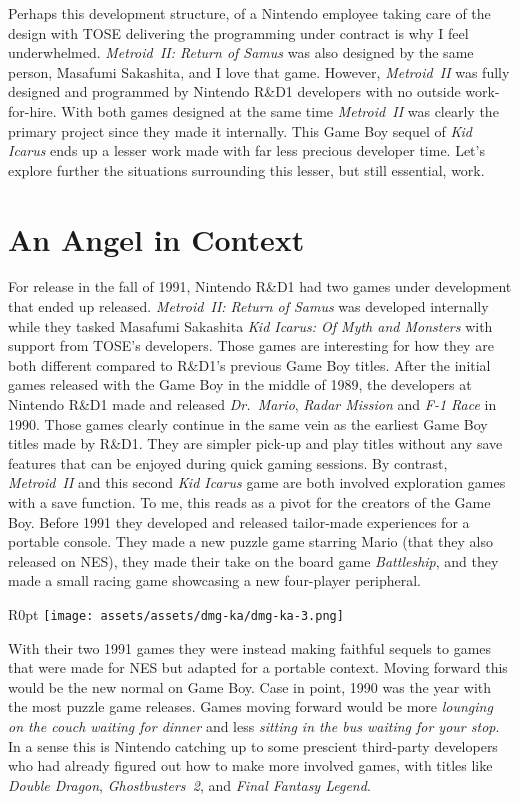 \documentclass{book}
\begin{document}
Perhaps this development structure, of a Nintendo employee taking care of the design with TOSE delivering the programming under contract is why I feel underwhelmed. \emph{Metroid II: Return of Samus} was also designed by the same person, Masafumi Sakashita, and I love that game. However, \emph{Metroid II} was fully designed and programmed by Nintendo R\&D1 developers with no outside work-for-hire. With both games designed at the same time \emph{Metroid II} was clearly the primary project since they made it internally. This Game Boy sequel of \emph{Kid Icarus} ends up a lesser work made with far less precious developer time. Let’s explore further the situations surrounding this lesser, but still essential, work.

\FloatBarrier\needspace{5pt}\section*{An Angel in Context}\nopagebreak[4]

For release in the fall of 1991, Nintendo R\&D1 had two games under development that ended up released. \emph{Metroid II: Return of Samus} was developed internally while they tasked Masafumi Sakashita \emph{Kid Icarus: Of Myth and Monsters} with support from TOSE’s developers. Those games are interesting for how they are both different compared to R\&D1’s previous Game Boy titles. After the initial games released with the Game Boy in the middle of 1989, the developers at Nintendo R\&D1 made and released \emph{Dr. Mario}, \emph{Radar Mission} and \emph{F-1 Race} in 1990. Those games clearly continue in the same vein as the earliest Game Boy titles made by R\&D1. They are simpler pick-up and play titles without any save features that can be enjoyed during quick gaming sessions. By contrast, \emph{Metroid II} and this second \emph{Kid Icarus} game are both involved exploration games with a save function. To me, this reads as a pivot for the creators of the Game Boy. Before 1991 they developed and released tailor-made experiences for a portable console. They made a new puzzle game starring Mario (that they also released on NES), they made their take on the board game \emph{Battleship}, and they made a small racing game showcasing a new four-player peripheral.

\begin{wrapfigure}{R}{0pt} \texttt{[image: assets/assets/dmg-ka/dmg-ka-3.png]}\end{wrapfigure}
With their two 1991 games they were instead making faithful sequels to games that were made for NES but adapted for a portable context. Moving forward this would be the new normal on Game Boy. Case in point, 1990 was the year with the most puzzle game releases. Games moving forward would be more \emph{lounging on the couch waiting for dinner} and less \emph{sitting in the bus waiting for your stop}. In a sense this is Nintendo catching up to some prescient third-party developers who had already figured out how to make more involved games, with titles like \emph{Double Dragon}, \emph{Ghostbusters 2}, and \emph{Final Fantasy Legend}.
\end{document}
